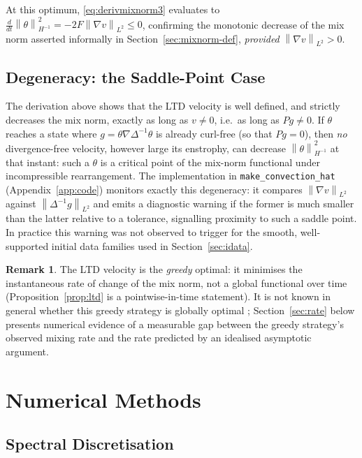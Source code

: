\documentclass[12pt,a4paper]{article}
\newcommand{\norm}[1]{\left\lVert#1\right\rVert}
\newcommand{\lapinv}{\Delta^{-1}}
\newcommand{\Proj}{P}
\theoremstyle{definition}
\newtheorem{remark}{Remark}
\theoremstyle{plain}
\begin{document}
At this optimum, \eqref{eq:derivmixnorm3} evaluates to
$\frac{d}{dt}\norm{\theta}_{H^{-1}}^2 = -2F\norm{\nabla v}_{L^2} \le 0$,
confirming the monotonic decrease of the mix norm asserted informally in
Section~\ref{sec:mixnorm-def}, \emph{provided} $\norm{\nabla v}_{L^2}>0$.

\subsection{Degeneracy: the Saddle-Point Case}
\label{sec:saddle}

The derivation above shows that the LTD velocity is well defined, and
strictly decreases the mix norm, exactly as long as $v\neq 0$, i.e.\ as
long as $\Proj g \neq 0$. If $\theta$ reaches a state where $g=\theta
\nabla\lapinv\theta$ is already curl-free (so that $\Proj g = 0$), then
\emph{no} divergence-free velocity, however large its enstrophy, can
decrease $\norm{\theta}_{H^{-1}}^2$ at that instant: such a $\theta$ is a
critical point of the mix-norm functional under incompressible
rearrangement. The implementation in \texttt{make\_convection\_hat}
(Appendix~\ref{app:code}) monitors exactly this degeneracy: it compares
$\norm{\nabla v}_{L^2}$ against $\norm{\lapinv g}_{L^2}$ and emits a
diagnostic warning if the former is much smaller than the latter relative
to a tolerance, signalling proximity to such a saddle point. In practice
this warning was not observed to trigger for the smooth, well-supported
initial data families used in Section~\ref{sec:idata}.

\begin{remark}
  The LTD velocity is the \emph{greedy} optimal: it minimises the
  instantaneous rate of change of the mix norm, not a global functional
  over time (Proposition~\ref{prop:ltd} is a pointwise-in-time statement).
  It is not known in general whether this greedy strategy is globally
  optimal \cite{Iyer2014,Drivas2022}; Section~\ref{sec:rate} below presents
  numerical evidence of a measurable gap between the greedy strategy's
  observed mixing rate and the rate predicted by an idealised asymptotic
  argument.
\end{remark}

\section{Numerical Methods}
\label{sec:numerics}

\subsection{Spectral Discretisation}
\end{document}
